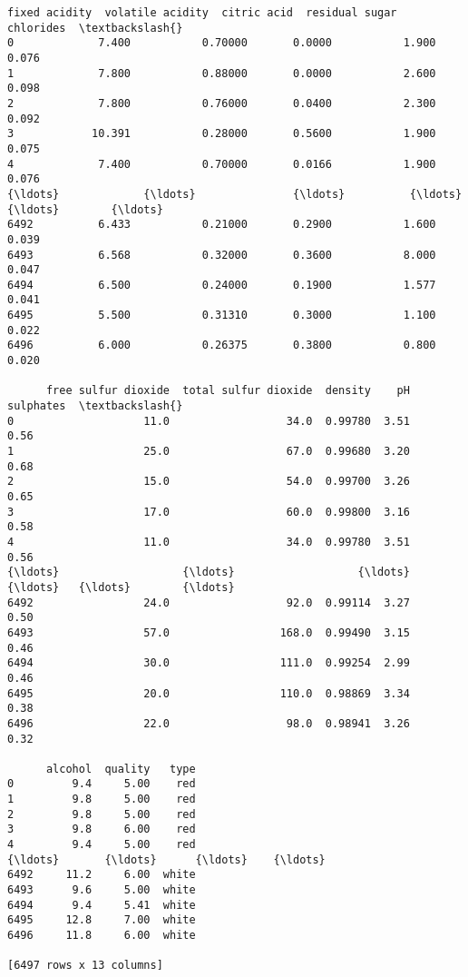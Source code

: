 \documentclass[11pt]{article}
\begin{document}
    
    \begin{Verbatim}[commandchars=\\\{\}]
      fixed acidity  volatile acidity  citric acid  residual sugar  chlorides  \textbackslash{}
0             7.400           0.70000       0.0000           1.900      0.076   
1             7.800           0.88000       0.0000           2.600      0.098   
2             7.800           0.76000       0.0400           2.300      0.092   
3            10.391           0.28000       0.5600           1.900      0.075   
4             7.400           0.70000       0.0166           1.900      0.076   
{\ldots}             {\ldots}               {\ldots}          {\ldots}             {\ldots}        {\ldots}   
6492          6.433           0.21000       0.2900           1.600      0.039   
6493          6.568           0.32000       0.3600           8.000      0.047   
6494          6.500           0.24000       0.1900           1.577      0.041   
6495          5.500           0.31310       0.3000           1.100      0.022   
6496          6.000           0.26375       0.3800           0.800      0.020   

      free sulfur dioxide  total sulfur dioxide  density    pH  sulphates  \textbackslash{}
0                    11.0                  34.0  0.99780  3.51       0.56   
1                    25.0                  67.0  0.99680  3.20       0.68   
2                    15.0                  54.0  0.99700  3.26       0.65   
3                    17.0                  60.0  0.99800  3.16       0.58   
4                    11.0                  34.0  0.99780  3.51       0.56   
{\ldots}                   {\ldots}                   {\ldots}      {\ldots}   {\ldots}        {\ldots}   
6492                 24.0                  92.0  0.99114  3.27       0.50   
6493                 57.0                 168.0  0.99490  3.15       0.46   
6494                 30.0                 111.0  0.99254  2.99       0.46   
6495                 20.0                 110.0  0.98869  3.34       0.38   
6496                 22.0                  98.0  0.98941  3.26       0.32   

      alcohol  quality   type  
0         9.4     5.00    red  
1         9.8     5.00    red  
2         9.8     5.00    red  
3         9.8     6.00    red  
4         9.4     5.00    red  
{\ldots}       {\ldots}      {\ldots}    {\ldots}  
6492     11.2     6.00  white  
6493      9.6     5.00  white  
6494      9.4     5.41  white  
6495     12.8     7.00  white  
6496     11.8     6.00  white  

[6497 rows x 13 columns]
    \end{Verbatim}
\end{document}
